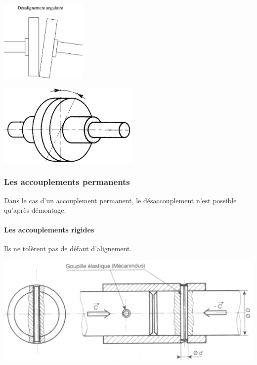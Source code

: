 \documentclass[11pt,oneside]{article}
\begin{document}
\begin{minipage}[c]{.45\linewidth}
\begin{center}
\includegraphics[height=4cm]{png/fig_07}
\end{center}
\end{minipage} \hfill
\begin{minipage}[c]{.45\linewidth}
\begin{center}
\includegraphics[height=4cm]{png/fig_08}
\end{center}
\end{minipage}

\subsubsection{Les accouplements permanents}
Dans le cas d’un accouplement permanent, le désaccouplement n’est possible qu’après démontage.
\paragraph{Les accouplements rigides}

Ils ne tolèrent pas de défaut d’alignement.

\begin{center}
\includegraphics[width=.7\textwidth]{png/fig_09}
\end{center}
\end{document}
